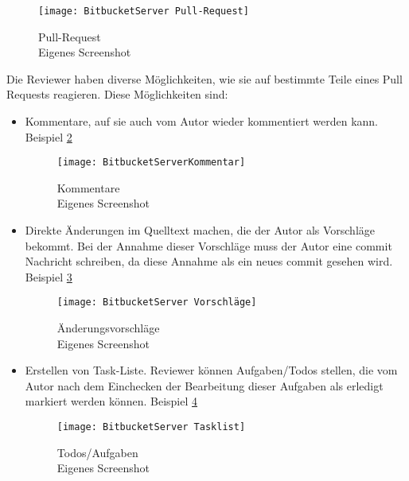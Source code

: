 \begin{figure}[H]
	\centering
	\texttt{[image: BitbucketServer Pull-Request]}
	\caption[Pull-Request auf Bitbucket-Server]{Pull-Request\\Eigenes Screenshot}
	\label{fig:BitbucketServer Pull-Request}
\end{figure}

Die Reviewer haben diverse Möglichkeiten, wie sie auf bestimmte Teile eines Pull Requests reagieren. Diese Möglichkeiten sind:
\begin{itemize}
	\item Kommentare, auf sie auch vom Autor wieder kommentiert werden kann. Beispiel \cref{fig:BitbucketServerKommentar}
	\begin{figure}[H]
		\centering
		\texttt{[image: BitbucketServerKommentar]}
		\caption[Bitbucket-Server Kommentare]{Kommentare\\Eigenes Screenshot}
		\label{fig:BitbucketServerKommentar}
	\end{figure}
	
	\item Direkte Änderungen im Quelltext machen, die der Autor als Vorschläge bekommt. Bei der Annahme dieser Vorschläge muss der Autor eine commit Nachricht schreiben, da diese 				Annahme als ein neues commit gesehen wird. Beispiel \cref{fig:BitbucketServer Vorschläge}
	\begin{figure}[H]
		\centering
		\texttt{[image: BitbucketServer Vorschläge]}
		\caption[Bitbucket-Server Änderungsvorschläge]{Änderungsvorschläge\\Eigenes Screenshot}
		\label{fig:BitbucketServer Vorschläge}
	\end{figure}
	
	
	\item Erstellen von Task-Liste. Reviewer können Aufgaben/Todos stellen, die vom Autor nach dem Einchecken der Bearbeitung dieser Aufgaben als erledigt markiert werden können. Beispiel 	\cref{fig:BitbucketServer Tasklist}
	\begin{figure}[H]
		\centering
		\texttt{[image: BitbucketServer Tasklist]}
		\caption[Bitbucket-Server Todos]{Todos/Aufgaben\\Eigenes Screenshot}
		\label{fig:BitbucketServer Tasklist}
	\end{figure}
\end{itemize}

